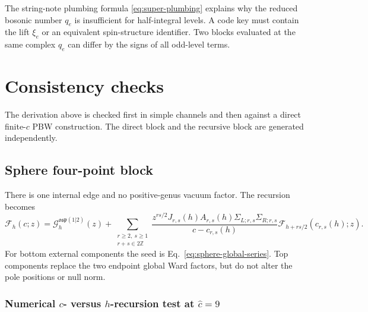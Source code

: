\documentclass[11pt]{article}
\newcommand{\osp}{\mathfrak{osp}(1|2)}
\newcommand{\F}{\mathcal F}
\newcommand{\G}{\mathcal G}
\begin{document}
The string-note plumbing formula \eqref{eq:super-plumbing} explains why the
reduced bosonic number \(q_e\) is insufficient for half-integral levels.
A code key must contain the lift \(\xi_e\) or an equivalent spin-structure
identifier.  Two blocks evaluated at the same complex \(q_e\) can differ by
the signs of all odd-level terms.


\section{Consistency checks}
\label{sec:consistency-checks}

The derivation above is checked first in simple channels and then against a
direct finite-\(c\) PBW construction.  The direct block and the recursive
block are generated independently.
\label{sec:specializations}

\subsection{Sphere four-point block}

There is one internal edge and no positive-genus vacuum factor.  The
recursion becomes
\begin{equation}
 \F_h(c;z)
 =\G_h^{\osp}(z)
 +\sum_{\substack{r\ge2,\ s\ge1\\r+s\in2\mathbb Z}}
 \frac{z^{rs/2}J_{r,s}(h)A_{r,s}(h)
       \Sigma_{L;r,s}\Sigma_{R;r,s}}
      {c-c_{r,s}(h)}
 \F_{h+rs/2}(c_{r,s}(h);z).
 \label{eq:sphere-recursion}
\end{equation}
For bottom external components the seed is
Eq.~\eqref{eq:sphere-global-series}.  Top components replace the two endpoint
global Ward factors, but do not alter the pole positions or null norm.

\subsubsection{\texorpdfstring{Numerical \(c\)- versus \(h\)-recursion test at
\(\widehat c=9\)}{Numerical c- versus h-recursion test at c-hat=9}}
\label{sec:sphere-c-h-order-ten-check}
\end{document}
